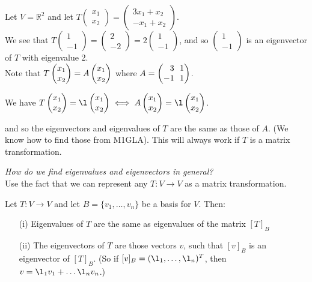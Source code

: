 \documentclass[10pt]{scrartcl}
\begin{document}
\begin{example} Let $V = \mathbb{R}^2$ and let $T\begin{pmatrix}
x_1 \\ x_2
\end{pmatrix} = \begin{pmatrix}
 3x_1 + x_2 \\ -x_1 + x_2
 \end{pmatrix}.$\\
 
 \noindent We see that $T\left(\begin{smallmatrix} 1\\-1 \end{smallmatrix}\right) = \left(\begin{smallmatrix}2\\-2 \end{smallmatrix}\right)  = 2\left(\begin{smallmatrix}1\\-1 \end{smallmatrix}\right) $, and so $\left(\begin{smallmatrix}1\\-1 \end{smallmatrix}\right) $
 is an eigenvector of $T$ with eigenvalue 2. \\
 
 Note that  $T\Spvek{x_1;x_2} = A\Spvek{x_1;x_2}$ where $A = \Spvek{3 ~~ 1; -1 ~~ 1}$. \\ \vspace*{10pt}
 
 We have $T\Spvek{x_1;x_2} = \l\Spvek{x_1;x_2} \iff A\Spvek{x_1;x_2} = \l\Spvek{x_1;x_2}$.\vspace*{5pt}
 
and so the eigenvectors and eigenvalues of $T$ are the same as those of $A$. (We know how to find those from M1GLA). This will always work if $T$ is a matrix transformation.
\end{example}
 
 \emph{How do we find eigenvalues and eigenvectors in general?}\\
 Use the fact that we can represent any $T: V \to V$ as a matrix transformation.\\
 
 \begin{proposition} Let $T: V \to V$ and let $B = \{v_1,\dots,v_n\}$ be a basis for $V$. Then:
 \begin{enumerate}
 \item[(i)] Eigenvalues of $T$ are the same as eigenvalues of the matrix $[T]_B$
 \item[(ii)] The eigenvectors of $T$ are those vectors $v$, such that $[v]_B$ is an eigenvector of $[T]_B$.  (So if $[v]_B = (\l_1,\dots,\l_n)^T$, then $v = \l_1v_1 + \dots \l_nv_n$.) 
 \end{enumerate}
 \end{proposition}
\end{document}
